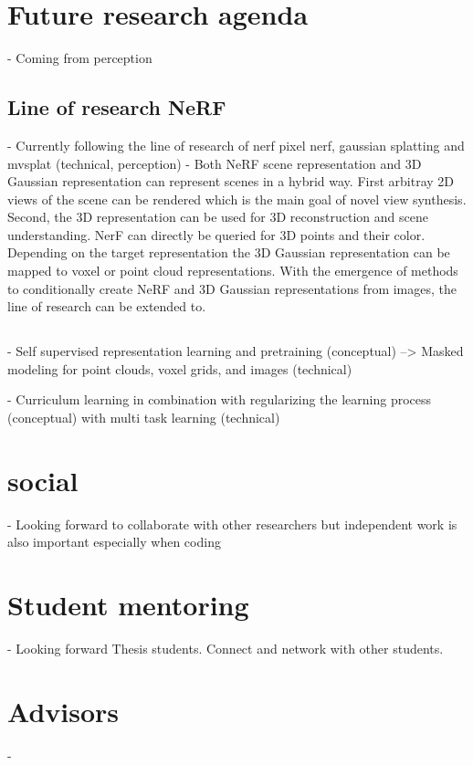 \section{Future research agenda}
- Coming from perception

\subsection{Line of research NeRF}
- Currently following the line of research of nerf \cite{nerf} pixel nerf, gaussian splatting and mvsplat (technical, perception)
- Both NeRF scene representation and 3D Gaussian representation can represent scenes in a hybrid way. First arbitray 2D views 
of the scene can be rendered which is the main goal of novel view synthesis. Second, the 3D representation can be used for
3D reconstruction and scene understanding. NerF can directly be queried for 3D points and their color. Depending on the target representation the 3D Gaussian representation
can be mapped to voxel or point cloud representations. With the emergence of methods to conditionally create NeRF and 3D Gaussian representations 
from images, the line of research can be extended to.
\subsection{}
- Self supervised representation learning and pretraining (conceptual)
    --> Masked modeling for point clouds, voxel grids, and images (technical) 

- Curriculum learning in combination with regularizing the learning process (conceptual) with multi task learning (technical)
\section{social}
- Looking forward to collaborate with other researchers but independent work is also important especially when coding
\section{Student mentoring}
- Looking forward Thesis students. Connect and network with other students.
\section{Advisors}
- \color{red}{Valada and Geiger} \color{black}